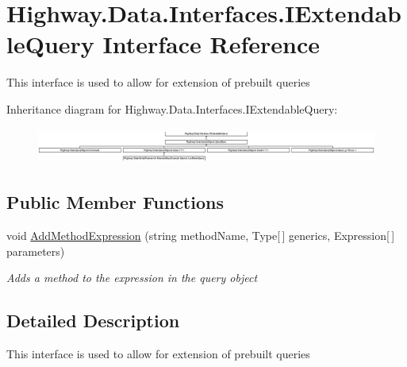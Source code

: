 \hypertarget{interface_highway_1_1_data_1_1_interfaces_1_1_i_extendable_query}{\section{Highway.\-Data.\-Interfaces.\-I\-Extendable\-Query Interface Reference}
\label{interface_highway_1_1_data_1_1_interfaces_1_1_i_extendable_query}
}


This interface is used to allow for extension of prebuilt queries  


Inheritance diagram for Highway.\-Data.\-Interfaces.\-I\-Extendable\-Query\-:\begin{figure}[H]
\begin{center}
\leavevmode
\includegraphics[height=1.183932cm]{interface_highway_1_1_data_1_1_interfaces_1_1_i_extendable_query}
\end{center}
\end{figure}
\subsection*{Public Member Functions}
\begin{DoxyCompactItemize}
\item 
void \hyperlink{interface_highway_1_1_data_1_1_interfaces_1_1_i_extendable_query_abf9d0846c2d2ca8542b2f685f6845998}{Add\-Method\-Expression} (string method\-Name, Type\mbox{[}$\,$\mbox{]} generics, Expression\mbox{[}$\,$\mbox{]} parameters)
\begin{DoxyCompactList}\small\item\em Adds a method to the expression in the query object \end{DoxyCompactList}\end{DoxyCompactItemize}


\subsection{Detailed Description}
This interface is used to allow for extension of prebuilt queries 



